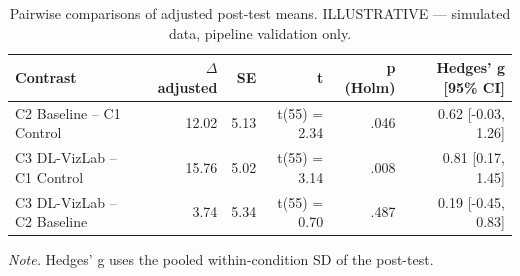 \begin{table}[htbp]
\centering
\small
\caption{Pairwise comparisons of adjusted post-test means. ILLUSTRATIVE — simulated data, pipeline validation only.}
\label{tab:T06}
\begin{tabular}{lrrrrr}
\toprule
Contrast & $\Delta$ adjusted & SE & t & p (Holm) & Hedges' g [95\% CI] \\
\midrule
C2 Baseline -- C1 Control & 12.02 & 5.13 & t(55) = 2.34 & .046 & 0.62 [-0.03, 1.26] \\
C3 DL-VizLab -- C1 Control & 15.76 & 5.02 & t(55) = 3.14 & .008 & 0.81 [0.17, 1.45] \\
C3 DL-VizLab -- C2 Baseline & 3.74 & 5.34 & t(55) = 0.70 & .487 & 0.19 [-0.45, 0.83] \\
\bottomrule
\end{tabular}
\par\smallskip\footnotesize\textit{Note.} Hedges' g uses the pooled within-condition SD of the post-test.
\end{table}
